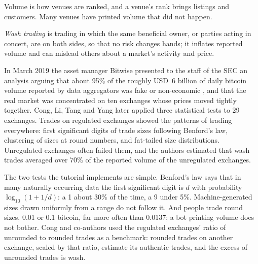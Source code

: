 Volume is how venues are ranked, and a venue's rank brings listings and customers. Many venues have printed
volume that did not happen.

\begin{definition}\label{def:m3:spot-markets:wash}
\emph{Wash trading} is trading in which the same beneficial owner, or parties acting in
concert, are on both sides, so that no risk changes hands; it inflates reported volume and can mislead others
about a market's activity and price.
\end{definition}

In March 2019 the asset manager Bitwise presented to the staff of the SEC an analysis arguing that about 95\% of
the roughly USD~6 billion of daily bitcoin volume reported by data aggregators was fake or non-economic , and that the real market was concentrated on ten exchanges whose prices moved tightly together. Cong, Li,
Tang and Yang later applied three statistical tests to 29 exchanges. Trades on regulated exchanges showed the
patterns of trading everywhere: first significant digits of trade sizes following Benford's law, clustering of
sizes at round numbers, and fat-tailed size distributions. Unregulated exchanges often failed them, and the authors
estimated that wash trades averaged over 70\% of the reported volume of the unregulated exchanges.

The two tests the tutorial implements are simple. Benford's law says that in many naturally occurring data the
first significant digit is $d$ with probability $\log_{10}(1 + 1/d)$: a 1 about 30\% of the time, a 9 under 5\%.
Machine-generated sizes drawn uniformly from a range do not follow it. And people trade round sizes, 0.01 or 0.1
bitcoin, far more often than 0.0137; a bot printing volume does not bother. Cong and co-authors used the regulated
exchanges' ratio of unrounded to rounded trades as a benchmark: rounded trades on another exchange, scaled by that
ratio, estimate its authentic trades, and the excess of unrounded trades is wash.

